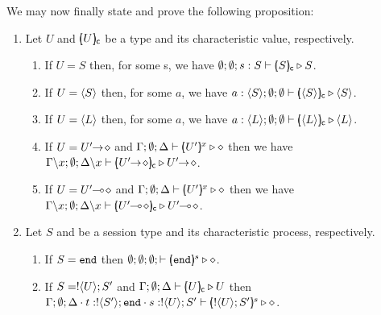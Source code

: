 \label{app:inhabit}

We may now finally state and prove the following proposition:

\begin{proposition}
	\label{app:characteristic_inhabit}
	\begin{enumerate}
		\item	Let $U$ and $[\!\!(U)\!\!]_{\mathsf{c}}$ be a type and its characteristic value, respectively. 
		\begin{enumerate}
			\item	If $U = S$ then, for some s, we have $\emptyset; \emptyset; s: S \vdash [\!\!(S)\!\!]_{\mathsf{c}} \triangleright S$.
	
			\item	If $U = \langle S \rangle$ then, for some $a$, we 
have $a: \langle S \rangle; \emptyset; \emptyset \vdash [\!\!(\langle S \rangle)\!\!]_{\mathsf{c}} \triangleright \langle S \rangle$.
	
			\item	If $U = \langle L \rangle$ then, for some $a$, we have $a: \langle L \rangle; \emptyset; \emptyset \vdash [\!\!(\langle L \rangle)\!\!]_{\mathsf{c}} \triangleright \langle L \rangle$.

			\item	If $U = U'\!\! \rightarrow\! \diamond$ and  
					$\Gamma; \emptyset; \Delta \vdash [\!\!(U')\!\!]^{x} \triangleright \diamond$
					 then we have 
					$\Gamma \backslash x ; \es; \Delta \backslash x \proves \omapchar{\shot{U'}} \hastype \shot{U'}$.

			\item	If $U = U'\!\! \multimap\! \diamond$ and
					$\Gamma; \emptyset; \Delta \vdash [\!\!(U')\!\!]^{x} \triangleright \diamond$
					 then we have 
					$\Gamma \backslash x ; \es; \Delta \backslash x \proves \omapchar{\lhot{U'}} \hastype \lhot{U'}$.

		\end{enumerate}

		\item	Let $S$ and  be a session type and its characteristic process, respectively. 
		\begin{enumerate}
			\item	If $S = \mathtt{end}$ then $\emptyset; \emptyset; \emptyset; \vdash [\!\!(\mathtt{end})\!\!]^{s} \triangleright \diamond$.
	
			\item	If $S = ! \langle U \rangle ; S'$ and  
					$\Gamma; \emptyset; \Delta \vdash [\!\!(U)\!\!]_{\mathsf{c}} \triangleright U$ then 
					$\Gamma; \emptyset; \Delta \cdot t: ! \langle S' \rangle ; \mathtt{end} \cdot s: ! \langle U \rangle ; S' \vdash [\!\!(! \langle U \rangle ; S')\!\!]^{s} \triangleright \diamond$.
	

\end{enumerate}
\end{enumerate}
\end{proposition}
